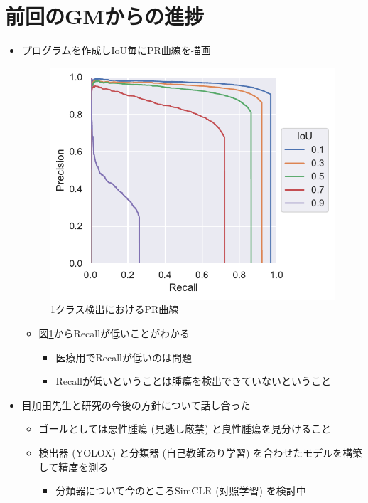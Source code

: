 \documentclass[a4j]{ujarticle}
\newcommand{\Fref}[1]{\mbox{図\ref{fig:#1}}}
\begin{document}
    \section{前回のGMからの進捗}
        \begin{itemize}
            \item プログラムを作成しIoU毎にPR曲線を描画
            \begin{figure}[h]
                \centering
                \includegraphics[width=.4\linewidth]{../fig/pr-curve.pdf}
                \caption{1クラス検出におけるPR曲線}
                \label{fig:pr}
            \end{figure}
            \begin{itemize}
                \item \Fref{pr}からRecallが低いことがわかる
                \begin{itemize}
                    \item 医療用でRecallが低いのは問題
                    \item Recallが低いということは腫瘍を検出できていないということ
                \end{itemize}
            \end{itemize}

            \item 目加田先生と研究の今後の方針について話し合った
            \begin{itemize}
                \item ゴールとしては悪性腫瘍 (見逃し厳禁) と良性腫瘍を見分けること
                \item 検出器 (YOLOX\cite{yolox}) と分類器 (自己教師あり学習) を合わせたモデルを構築して精度を測る
                \begin{itemize}
                    \item 分類器について今のところSimCLR\cite{simclr} (対照学習) を検討中
                \end{itemize}
            \end{itemize}
        \end{itemize}
\end{document}
